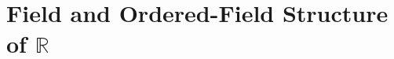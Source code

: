 \section{\texorpdfstring{Field and Ordered-Field Structure of $\mathbb{R}$}{Field and Ordered-Field Structure of R}}


